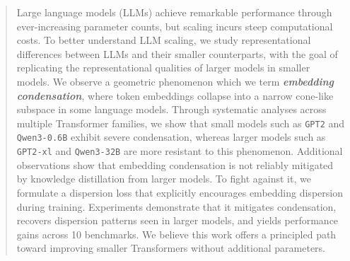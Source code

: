 \documentclass{article}
\theoremstyle{plain}
\theoremstyle{definition}
\theoremstyle{remark}
\begin{document}
\printAffiliationsAndNotice{\icmlEqualContribution}


\begin{abstract}
\vspace{-1.5pt}
Large language models (LLMs) achieve remarkable performance through ever-increasing parameter counts, but scaling incurs steep computational costs. To better understand LLM scaling, we study representational differences between LLMs and their smaller counterparts, with the goal of replicating the representational qualities of larger models in smaller models. We observe a geometric phenomenon which we term \textit{\textbf{embedding condensation}}, where token embeddings collapse into a narrow cone-like subspace in some language models. Through systematic analyses across multiple Transformer families, we show that small models such as \texttt{GPT2} and \texttt{Qwen3-0.6B} exhibit severe condensation, whereas larger models such as \texttt{GPT2-xl} and \texttt{Qwen3-32B} are more resistant to this phenomenon. Additional observations show that embedding condensation is not reliably mitigated by knowledge distillation from larger models. To fight against it, we formulate a dispersion loss that explicitly encourages embedding dispersion during training. Experiments demonstrate that it mitigates condensation, recovers dispersion patterns seen in larger models, and yields performance gains across 10 benchmarks. We believe this work offers a principled path toward improving smaller Transformers without additional parameters.
\end{abstract}
\end{document}
